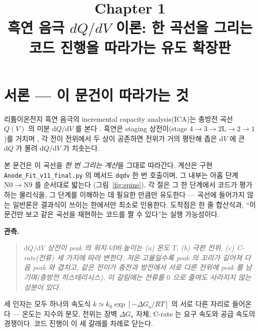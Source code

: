 \documentclass[11pt,a4paper]{article}
\title{\textbf{\LARGE Chapter 1}\\[0.35em]\Large 흑연 음극 $dQ/dV$ 이론: 한 곡선을 그리는 코드 진행을 따라가는 유도 확장판}
\author{}
\date{}
\newcommand{\dd}{\mathrm{d}}
\newcommand{\code}[1]{\texttt{#1}}
\begin{document}
\maketitle

\section*{서론 — 이 문건이 따라가는 것}
리튬이온전지 흑연 음극의 incremental capacity analysis(ICA)는 충방전 곡선 $Q(V)$ 의 미분
$\dd Q/\dd V$ 를 본다 \cite{bloom2005,dubarry2012}. 흑연은 staging 상전이(stage
$4\!\to\!3\!\to\!2\mathrm L\!\to\!2\!\to\!1$)를 거치며 \cite{dahn1991,ohzuku1993}, 각 전이 전위에서
두 상이 공존하면 전위가 거의 평탄해 좁은 $\dd V$ 에 큰 $\dd Q$ 가 몰려 $\dd Q/\dd V$ 가 치솟는다.

본 문건은 이 곡선을 \emph{한 번 그리는 계산}을 그대로 따라간다. 계산은 구현 \code{Anode\_Fit\_v11\_final.py}
의 메서드 \code{dqdv} 한 번 호출이며, 그 내부는 아홉 단계 $\mathrm N0\!\to\!\mathrm N9$ 를 순서대로 밟는다
(그림~\ref{fig:spine}). 각 절은 그 한 단계에서 코드가 평가하는 물리식을, 그 단계를 이해하는 데 필요한 만큼만
유도한다 — 곡선에 들어가지 않는 일반론은 결과식이 쓰이는 한에서만 최소로 인용한다. 도착점은 한 줄 합산식과,
``이 문건만 보고 같은 곡선을 재현하는 코드를 짤 수 있다''는 실행 가능성이다.

\textbf{관측.}
\begin{quote}\itshape
$\dd Q/\dd V$ 상전이 peak 의 위치$\cdot$너비$\cdot$높이는 (a) 온도 $T$, (b) 극판 전위, (c) C-rate(전류)
세 가지에 따라 변한다. 저온$\cdot$고율일수록 peak 의 꼬리가 길어져 다음 peak 와 겹치고, 같은 전이가 충전과 방전에서
서로 다른 전위에 peak 를 남기며(충방전 히스테리시스), 이 갈림에는 전류를 $0$ 으로 줄여도 사라지지 않는 성분이 있다.
\end{quote}

세 인자는 모두 하나의 속도식 $k\simeq k_0\exp[-\Delta G_a/RT]$ 의 서로 다른 자리로 들어온다 — 온도는 지수의 분모,
전위는 장벽 $\Delta G_a$ 자체, C-rate 는 요구 속도와 공급 속도의 경쟁이다. 코드 진행이 이 세 갈래를 차례로 닫는다.
\end{document}
